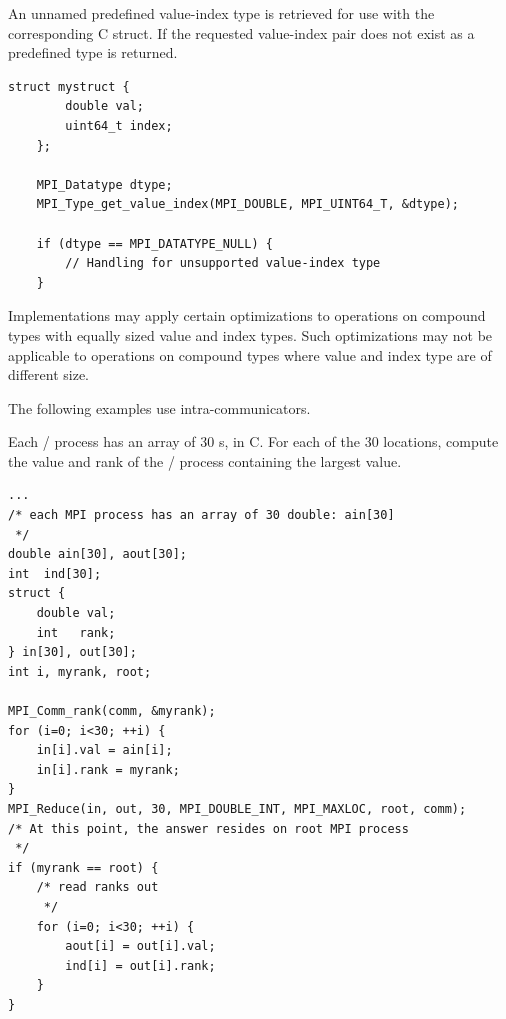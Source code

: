 \begin{example}
\label{coll-value-index-c}
An unnamed predefined value-index type is retrieved for use with the corresponding C struct.
If the requested value-index pair does not exist as a predefined type  is returned.

\begin{lstlisting}[language={[MPI]C}]
    struct mystruct {
        double val;
        uint64_t index;
    };

    MPI_Datatype dtype;
    MPI_Type_get_value_index(MPI_DOUBLE, MPI_UINT64_T, &dtype);

    if (dtype == MPI_DATATYPE_NULL) {
        // Handling for unsupported value-index type
    }
\end{lstlisting}
\end{example}

\begin{users}
    Implementations may apply certain optimizations to operations on compound types with equally sized value and index types. Such optimizations may not be applicable to operations on compound types where value and index type are of different size.
\end{users}

The following examples use intra-communicators.

\begin{example}
\label{coll-exminlocC}
%
Each \MPI/ process has an array of 30 s, in C.  For each
of the 30 locations, compute the value and rank of the \MPI/ process containing
the largest value.

\begin{lstlisting}[language={[MPI]C}]
...
/* each MPI process has an array of 30 double: ain[30]
 */
double ain[30], aout[30];
int  ind[30];
struct {
    double val;
    int   rank;
} in[30], out[30];
int i, myrank, root;

MPI_Comm_rank(comm, &myrank);
for (i=0; i<30; ++i) {
    in[i].val = ain[i];
    in[i].rank = myrank;
}
MPI_Reduce(in, out, 30, MPI_DOUBLE_INT, MPI_MAXLOC, root, comm);
/* At this point, the answer resides on root MPI process
 */
if (myrank == root) {
    /* read ranks out
     */
    for (i=0; i<30; ++i) {
        aout[i] = out[i].val;
        ind[i] = out[i].rank;
    }
}
\end{lstlisting}
\end{example}



